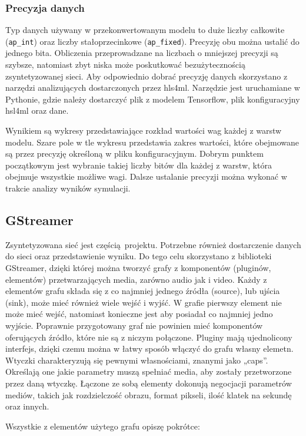 \documentclass[12pt, oneside]{article}
\begin{document}
\subsubsection{Precyzja danych}
Typ danych używany w przekonwertowanym modelu to duże liczby całkowite
(\lstinline{ap_int}) oraz liczby stałoprzecinkowe (\lstinline{ap_fixed}).
Precyzję obu można ustalić do jednego bita.
Obliczenia przeprowadzane na liczbach o mniejszej
precyzji są szybsze, natomiast zbyt niska może poskutkować
bezużytecznością zsyntetyzowanej sieci. Aby odpowiednio dobrać precyzję
danych skorzystano z narzędzi analizujących dostarczonych przez hls4ml.
Narzędzie jest uruchamiane w Pythonie, gdzie należy dostarczyć plik z modelem
Tensorflow, plik konfiguracyjny hsl4ml oraz dane.

Wynikiem są wykresy przedstawiające 
rozkład wartości wag każdej z warstw modelu. Szare pole w tle wykresu
przedstawia zakres wartości, które obejmowane są przez precyzję określoną
w pliku konfiguracyjnym. Dobrym punktem początkowym jest wybranie takiej
liczby bitów dla każdej z warstw, która obejmuje wszystkie możliwe wagi.
Dalsze ustalanie precyzji można wykonać w trakcie analizy wyników
symulacji.

\subsection{GStreamer}
Zsyntetyzowana sieć jest częścią projektu. Potrzebne również dostarczenie
danych do sieci oraz przedstawienie wyniku.
Do tego celu skorzystano z biblioteki GStreamer, dzięki której można
tworzyć grafy z komponentów (pluginów, elementów)
przetwarzających media, zarówno audio jak i video.
Każdy z elementów grafu składa się z co najmniej jednego źródła (source),
lub ujścia (sink), może mieć również wiele wejść i wyjść. W grafie pierwszy
element nie może mieć wejść, natomiast konieczne jest aby posiadał co najmniej
jedno wyjście. Poprawnie przygotowany graf nie powinien mieć komponentów
oferujących źródło, które nie są z niczym połączone.
Pluginy mają ujednolicony interfejs, dzięki czemu można w łatwy sposób
włączyć do grafu własny elemetn. Wtyczki charakteryzują się
pewnymi własnościami, znanymi jako „caps”. Określają one jakie parametry
muszą spełniać media, aby zostały przetworzone przez daną wtyczkę.
Łączone ze sobą elementy dokonują negocjacji
parametrów mediów, takich jak rozdzielczość obrazu, format pikseli,
ilość klatek na sekundę oraz innych.

Wszystkie z elementów użytego grafu opiszę pokrótce:
\end{document}
